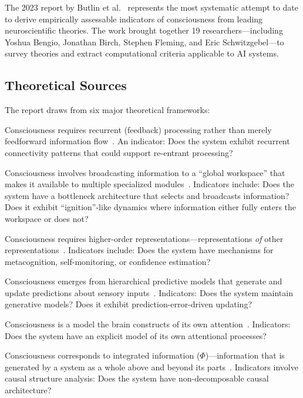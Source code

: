 The 2023 report by Butlin et al.~\citep{butlin2023consciousness} represents the most systematic attempt to date to derive empirically assessable indicators of consciousness from leading neuroscientific theories. The work brought together 19 researchers---including Yoshua Bengio, Jonathan Birch, Stephen Fleming, and Eric Schwitzgebel---to survey theories and extract computational criteria applicable to AI systems.

\subsection{Theoretical Sources}

The report draws from six major theoretical frameworks:

\begin{description}[leftmargin=*]
    \item[Recurrent Processing Theory (RPT):] Consciousness requires recurrent (feedback) processing rather than merely feedforward information flow~\citep{lamme2006recurrent}. An indicator: Does the system exhibit recurrent connectivity patterns that could support re-entrant processing?

    \item[Global Workspace Theory (GWT):] Consciousness involves broadcasting information to a ``global workspace'' that makes it available to multiple specialized modules~\citep{baars1988cognitive, dehaene2011experimental}. Indicators include: Does the system have a bottleneck architecture that selects and broadcasts information? Does it exhibit ``ignition''-like dynamics where information either fully enters the workspace or does not?

    \item[Higher-Order Theories (HOT):] Consciousness requires higher-order representations---representations \emph{of} other representations~\citep{rosenthal2005consciousness}. Indicators include: Does the system have mechanisms for metacognition, self-monitoring, or confidence estimation?

    \item[Predictive Processing (PP):] Consciousness emerges from hierarchical predictive models that generate and update predictions about sensory inputs~\citep{clark2013whatever, seth2013interoceptive}. Indicators: Does the system maintain generative models? Does it exhibit prediction-error-driven updating?

    \item[Attention Schema Theory (AST):] Consciousness is a model the brain constructs of its own attention~\citep{graziano2019attention}. Indicators: Does the system have an explicit model of its own attentional processes?

    \item[Integrated Information Theory (IIT):] Consciousness corresponds to integrated information ($\Phi$)---information that is generated by a system as a whole above and beyond its parts~\citep{tononi2016integrated}. Indicators involve causal structure analysis: Does the system have non-decomposable causal architecture?
\end{description}

